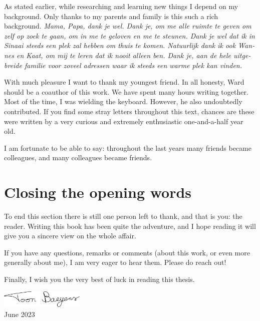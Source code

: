 As stated earlier, while researching and learning new things I depend on my background. Only thanks to my parents and family is this such a rich background. \emph{\foreignlanguage{dutch}{Mama, Papa, dank je wel. Dank je, om me alle ruimte te geven om zelf op zoek te gaan, om in me te geloven en me te steunen. Dank je wel dat ik in Sinaai steeds een plek zal hebben om thuis te komen. Natuurlijk dank ik ook Wannes en Kaat, om mij te leren dat ik nooit alleen ben. Dank je, aan de hele uitgebreide familie voor zoveel adressen waar ik steeds een warme plek kan vinden.}}

With much pleasure I want to thank my youngest friend. In all honesty, Ward should be a coauthor of this work. We have spent many hours writing together. Most of the time, I was wielding the keyboard. However, he also undoubtedly contributed. If you find some stray letters throughout this text, chances are these were written by a very curious and extremely enthusiastic one-and-a-half year old.

I am fortunate to be able to say: throughout the last years many friends became colleagues, and many colleagues became friends.




\section*{Closing the opening words}

To end this section there is still one person left to thank, and that is you: the reader. Writing this book has been quite the adventure, and I hope reading it will give you a sincere view on the whole affair.


If you have any questions, remarks or comments (about this work, or even more generally about me), I am very eager to hear them. Please do reach out!

Finally, I wish you the very best of luck in reading this thesis.


\begin{flushright}
    \includegraphics[width=4cm]{img/signature.pdf}\\
    June 2023
\end{flushright}

\stopchapter

